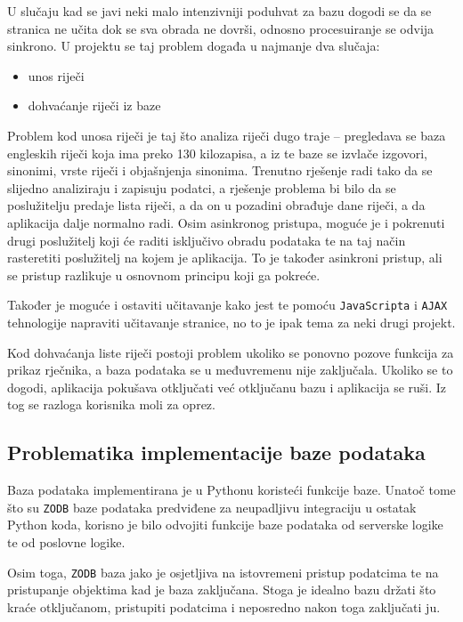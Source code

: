 \documentclass{foi}
\begin{document}
U slučaju kad se javi neki malo intenzivniji poduhvat za bazu dogodi se da se
stranica ne učita dok se sva obrada ne dovrši, odnosno procesuiranje se odvija
sinkrono. U projektu se taj problem događa u najmanje dva slučaja:
\begin{itemize}
	\item unos riječi
	\item dohvaćanje riječi iz baze
\end{itemize}

Problem kod unosa riječi je taj što analiza riječi dugo traje -- pregledava se
baza engleskih riječi koja ima preko 130 kilozapisa, a iz te baze se izvlače
izgovori, sinonimi, vrste riječi i objašnjenja sinonima. Trenutno rješenje radi
tako da se slijedno analiziraju i zapisuju podatci, a rješenje problema bi bilo
da se poslužitelju predaje lista riječi, a da on u pozadini obrađuje dane
riječi, a da aplikacija dalje normalno radi. Osim asinkronog pristupa, moguće
je i pokrenuti drugi poslužitelj koji će raditi isključivo obradu podataka te na taj
način rasteretiti poslužitelj na kojem je aplikacija. To je također asinkroni
pristup, ali se pristup razlikuje u osnovnom principu koji ga pokreće.

Također je moguće i ostaviti učitavanje kako jest te pomoću
\texttt{JavaScripta} i \texttt{AJAX} tehnologije napraviti učitavanje stranice,
no to je ipak tema za neki drugi projekt.

Kod dohvaćanja liste riječi postoji problem ukoliko se ponovno pozove funkcija
za prikaz rječnika, a baza podataka se u međuvremenu nije zaključala. Ukoliko
se to dogodi, aplikacija pokušava otključati već otključanu bazu i aplikacija
se ruši. Iz tog se razloga korisnika moli za oprez.

\subsection{Problematika implementacije baze podataka}

Baza podataka implementirana je u Pythonu koristeći funkcije baze. Unatoč tome
što su \texttt{ZODB} baze podataka predviđene za neupadljivu integraciju u
ostatak Python koda, korisno je bilo odvojiti funkcije baze podataka od
serverske logike te od poslovne logike.

Osim toga, \texttt{ZODB} baza jako je osjetljiva na istovremeni pristup
podatcima te na pristupanje objektima kad je baza zaključana. Stoga je idealno
bazu držati što kraće otključanom, pristupiti podatcima i neposredno nakon toga
zaključati ju.
\end{document}
